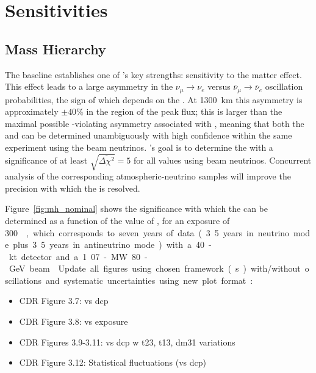 \section{Sensitivities}
\label{sec:physics-lbnosc-results}


\subsection{Mass Hierarchy}
\label{sec:physics-lbnosc-mh}

The  baseline establishes one of 's key strengths: sensitivity to the matter effect. This effect leads to a large asymmetry in the $\nu_\mu\to \nu_e$ versus $\bar{\nu}_\mu \to \bar{\nu}_e$ oscillation probabilities, the sign of which depends on the .  At 1300~km this asymmetry is approximately $\pm 40\%$ in the region of the peak flux; this is larger than the maximal possible -violating asymmetry associated with \deltacp, meaning that both the  and \deltacp can be determined
unambiguously with high confidence within the same experiment using the beam neutrinos.  's goal is to determine the  with a significance of at least $\sqrt{\overline{\Delta\chi^{2}}} = 5$ for all \deltacp values using beam neutrinos.  Concurrent analysis of the corresponding atmospheric-neutrino samples will improve the precision with which the  is resolved.

Figure~\ref{fig:mh_nominal} shows the significance with which the  can be determined as a function of the value of \deltacp, for an exposure of \SI{300}~\ktMWyr, which corresponds to seven years of data (3.5 years in neutrino mode plus 3.5 years in antineutrino mode) with a 40-kt detector and a 1.07-MW 80-GeV beam %

 Update all figures using chosen framework(s) with/without oscillations and systematic uncertainties using new plot format:
\begin{itemize}
\item CDR Figure 3.7: vs dcp
\item CDR Figure 3.8: vs exposure
\item CDR Figures 3.9-3.11: vs dcp w t23, t13, dm31 variations
\item CDR Figure 3.12: Statistical fluctuations (vs dcp)
\end{itemize}

